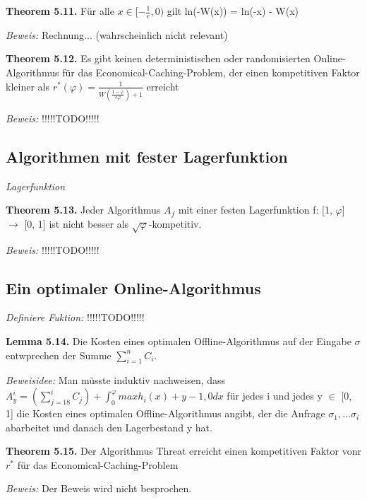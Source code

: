 \textbf{Theorem 5.11.} Für alle $x \in [-\frac{1}{e}, 0)$ gilt ln(-W(x)) = ln(-x) - W(x)

\textit{Beweis:} Rechnung... (wahrscheinlich nicht relevant)

\textbf{Theorem 5.12.} Es gibt keinen deterministischen oder randomisierten Online-Algorithmus für das Economical-Caching-Problem, der einen kompetitiven Faktor kleiner als $r^{*}(\varphi) = \frac{1}{W(\frac{1-\varphi}{e\varphi})+1}$ erreicht

\textit{Beweis:} !!!!!TODO!!!!!

\subsection{Algorithmen mit fester Lagerfunktion}

\textit{Lagerfunktion}

\textbf{Theorem 5.13.} Jeder Algorithmus $A_{f}$ mit einer festen Lagerfunktion f: [1, $\varphi$] $\to$ [0, 1] ist nicht besser als $\sqrt{\varphi}$-kompetitiv.

\textit{Beweis:} !!!!!TODO!!!!!

\subsection{Ein optimaler Online-Algorithmus}

\textit{Definiere Fuktion:} !!!!!TODO!!!!!

\textbf{Lemma 5.14.} Die Kosten eines optimalen Offline-Algorithmus auf der Eingabe $\sigma$ entwprechen der Summe $\sum_{i=1}^{n} C_{i}$.

\textit{Beweisidee:} Man müsste induktiv nachweisen, dass $A_{y}^{i} = (\sum_{j=18}^{i} C_{j} ) + \int_{0}^{\varphi} max{h_{i}(x) + y - 1, 0} dx $ für jedes i und jedes y $\in$ [0, 1] die Kosten eines optimalen Offline-Algorithmus angibt, der die Anfrage $\sigma_{1}, ... \sigma_{i}$ abarbeitet und danach den Lagerbestand y hat.

\textbf{Theorem 5.15.} Der Algorithmus Threat erreicht einen kompetitiven Faktor vonr $r^{*}$ für das Economical-Caching-Problem

\textit{Beweis:} Der Beweis wird nicht besprochen.
